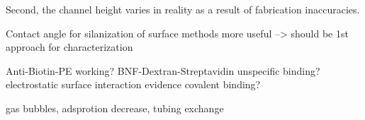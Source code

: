 Second, the channel height varies in reality as a result of fabrication inaccuracies. 

Contact angle for silanization of surface methods more useful --> should be 1st approach for characterization

Anti-Biotin-PE working?
BNF-Dextran-Streptavidin unspecific binding?
electrostatic surface interaction
evidence covalent binding?

gas bubbles, adsprotion decrease, tubing exchange